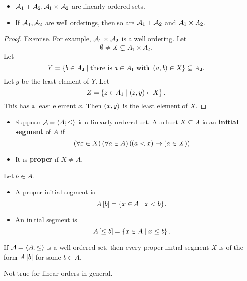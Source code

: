 \begin{lemma}
\hfill
\begin{itemize}
\item $ \AA_1 + \AA_2, \AA_1 \times \AA_2 $ are linearly ordered sets.
\item If $ \AA_1, \AA_2 $ are well orderings, then so are $ \AA_1 + \AA_2 $ and $ \AA_1 \times A_2 $.
\end{itemize}
\end{lemma}

\begin{proof}
Exercise. For example, $ \AA_1 \times \AA_2 $ is a well ordering. Let
$$ \emptyset \ne X \subsetneq A_1 \times A_2. $$
Let
$$ Y = \cb{b \in A_2 \mid \text{there is} \ a \in A_1 \ \text{with} \ \rb{a, b} \in X} \subseteq A_2. $$
Let $ y $ be the least element of $ Y $. Let
$$ Z = \cb{z \in A_1 \mid \rb{z, y} \in X}. $$
This has a least element $ x $. Then $ \rb{x, y} $ is the least element of $ X $.
\end{proof}

\begin{definition}
\hfill
\begin{itemize}
\item Suppose $ \AA = \ab{A; \le} $ is a linearly ordered set. A subset $ X \subseteq A $ is an \textbf{initial segment} of $ A $ if
$$ \fab{x \in X}\fab{a \in A}\impb{\ltb{a}{x}}{\inb{a}{X}} $$
\item It is \textbf{proper} if $ X \ne A $.
\end{itemize}
\end{definition}

\begin{example2}
Let $ b \in A $.
\begin{itemize}
\item A proper initial segment is
$$ A\sb{b} = \cb{x \in A \mid x < b}. $$
\item An initial segment is
$$ A\sb{\le b} = \cb{x \in A \mid x \le b}. $$
\end{itemize}
\end{example2}

\begin{lemma}
\label{lem:3.3.6}
If $ \AA = \ab{A; \le} $ is a well ordered set, then every proper initial segment $ X $ is of the form $ A\sb{b} $ for some $ b \in A $.
\end{lemma}

\begin{remark2}
Not true for linear orders in general.
\end{remark2}

